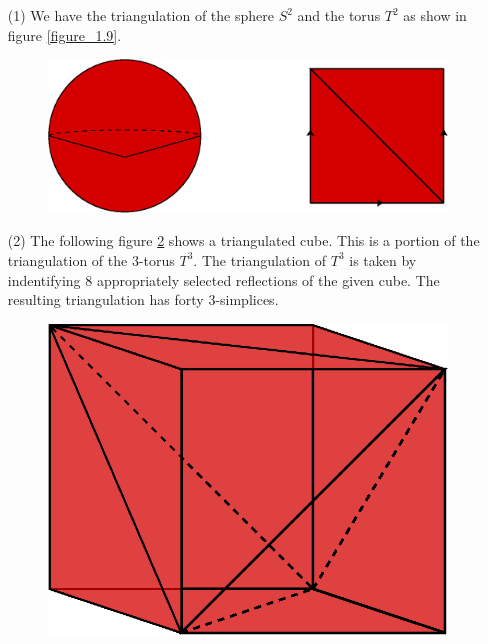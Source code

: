 \begin{example}\label{example_1.14}
    \begin{enumerate}
        \item[(1)] We have the triangulation of the sphere $S^2$ and the torus
            $T^2$ as show in figure \ref{figure_1.9}.
            \begin{figure}[h]
                \centering
                \includegraphics[scale=0.5]{Figures/Chapter1/trangulations_S^2_T^2.eps}
                \caption{}
                \label{figure_1.10}
            \end{figure}

        \item[(2)] The following figure \ref{figure_1.11} shows a triangulated
            cube. This is a portion of the triangulation of the $3$-torus
            $T^3$. The triangulation of  $T^3$ is taken by indentifying  $8$
            appropriately selected reflections of the given cube. The resulting
            triangulation has forty $3$-simplices.
            \begin{figure}[h]
                \centering
                \includegraphics[scale=0.5]{Figures/Chapter1/trangulation_T^3.eps}
                \caption{}
                \label{figure_1.11}
            \end{figure}
    \end{enumerate}
\end{example}


